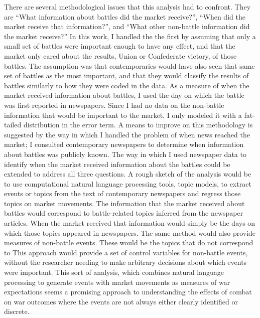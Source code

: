 There are several methodological issues that this analysis had to confront.
They are ``What information about battles did the market receive?'', ``When did the market receive that information?'', and ``What other non-battle information did the market receive?''
In this work, I handled the the first by assuming that only a small set of battles were important enough to have any effect, and that the market only cared about the results, Union or Confederate victory, of those battles.
The assumption was that contemporaries would have also seen that same set of  battles as the most important, and that they would classify the results of battles similarly to how they were coded in the data.
As a measure of when the market received information about battles, I used the day on which the battle was first reported in newspapers.
Since I had no data on the non-battle information that would be important to the market, I only modeled it with a fat-tailed distribution in the error term.
A means to improve on this methodology is suggested by the way in which I handled the problem of when news reached the market; I consulted contemporary newspapers to determine when information about battles was publicly known.
The way in which I used newspaper data to identify when the market received information about the battles could be extended to address all three questions.
A rough sketch of the analysis would be to use computational natural language processing tools, \eg{}topic models, to extract events or topics from the text of contemporary newspapers and regress those topics on market movements.
The information that the market received about battles would correspond to battle-related topics inferred from the newspaper articles.
When the market received that information would simply be the days on which those topics appeared in newspapers.
The same method would also provide measures of non-battle events.
These would be the topics that do not correspond to 
This approach would provide a set of control variables for non-battle events, without the researcher needing to make arbitrary decisions about which events were important.
This sort of analysis, which combines natural language processing to generate events with market movements as measures of war expectations seems a promising approach to understanding the effects of combat on war outcomes where the events are not always either clearly identified or discrete. 



